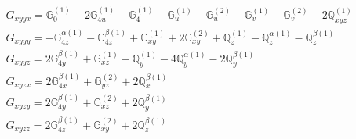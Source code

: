\documentclass[fleqn,8pt,landscape]{jsarticle}
\begin{document}
\begin{align*}
& G_{xyyx} = \mathbb{G}_{0}^{(1)} + 2 \mathbb{G}_{4u}^{(1)} - \mathbb{G}_{4}^{(1)} - \mathbb{G}_{u}^{(1)} - \mathbb{G}_{u}^{(2)} + \mathbb{G}_{v}^{(1)} - \mathbb{G}_{v}^{(2)} - 2 \mathbb{Q}_{xyz}^{(1)} \\
& G_{xyyy} = - \mathbb{G}_{4z}^{\alpha(1)} - \mathbb{G}_{4z}^{\beta(1)} + \mathbb{G}_{xy}^{(1)} + 2 \mathbb{G}_{xy}^{(2)} + \mathbb{Q}_{z}^{(1)} - \mathbb{Q}_{z}^{\alpha(1)} - \mathbb{Q}_{z}^{\beta(1)} \\
& G_{xyyz} = 2 \mathbb{G}_{4y}^{\beta(1)} + \mathbb{G}_{xz}^{(1)} - \mathbb{Q}_{y}^{(1)} - 4 \mathbb{Q}_{y}^{\alpha(1)} - 2 \mathbb{Q}_{y}^{\beta(1)} \\
& G_{xyzx} = 2 \mathbb{G}_{4x}^{\beta(1)} + \mathbb{G}_{yz}^{(2)} + 2 \mathbb{Q}_{x}^{\beta(1)} \\
& G_{xyzy} = 2 \mathbb{G}_{4y}^{\beta(1)} + \mathbb{G}_{xz}^{(2)} + 2 \mathbb{Q}_{y}^{\beta(1)} \\
& G_{xyzz} = 2 \mathbb{G}_{4z}^{\beta(1)} + \mathbb{G}_{xy}^{(2)} + 2 \mathbb{Q}_{z}^{\beta(1)}
\end{align*}
\end{document}
